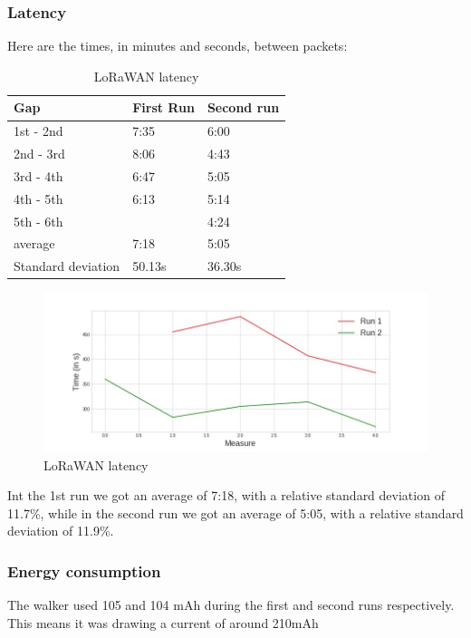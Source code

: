 		\subsubsection{Latency}
			Here are the times, in minutes and seconds, between packets:
			\begin{table}[h]
				\begin{tabular}{@{}lll@{}}
					\toprule
					\textbf{Gap}&\textbf{First Run}& \textbf{Second run} 	 \\ \midrule
					1st - 2nd 			&	7:35		& 	6:00     	 \\
					2nd - 3rd 			&	8:06    	& 	4:43         \\
					3rd - 4th 			&	6:47		& 	5:05         \\
					4th - 5th 			&	6:13    	& 	5:14         \\
					5th - 6th 			&	         	& 	4:24         \\ \bottomrule
					average     		&   7:18        &   5:05		 \\
					Standard deviation  &   50.13s      &   36.30s		 \\ \bottomrule
				\end{tabular}
				\caption[LoRaWAN latency]{LoRaWAN latency}
				\label{tab:Latency}
			\end{table}
		
			\begin{figure}[h]
				\centering
				\includegraphics[width=1.1\linewidth]{gfx/latency_diff.jpg}
				\caption{LoRaWAN latency}
				\label{fig:Latency}
			\end{figure}

			Int the 1st run we got an average of 7:18, with a relative standard deviation of 11.7\%, while in the second run we got an average of 5:05, with a relative standard deviation of 11.9\%.

		\subsubsection{Energy consumption}
			The walker used 105 and 104 mAh during the first and second runs respectively. This means it was drawing a current of around 210mAh

